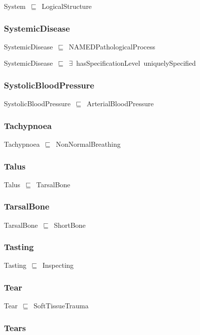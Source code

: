 \documentclass{article}
\begin{document}
System~\ensuremath{\sqsubseteq}~LogicalStructure~

\subsubsection*{SystemicDisease}

SystemicDisease~\ensuremath{\sqsubseteq}~NAMEDPathologicalProcess~

SystemicDisease~\ensuremath{\sqsubseteq}~\ensuremath{\exists}~hasSpecificationLevel~uniquelySpecified~

\subsubsection*{SystolicBloodPressure}

SystolicBloodPressure~\ensuremath{\sqsubseteq}~ArterialBloodPressure~

\subsubsection*{Tachypnoea}

Tachypnoea~\ensuremath{\sqsubseteq}~NonNormalBreathing~

\subsubsection*{Talus}

Talus~\ensuremath{\sqsubseteq}~TarsalBone~

\subsubsection*{TarsalBone}

TarsalBone~\ensuremath{\sqsubseteq}~ShortBone~

\subsubsection*{Tasting}

Tasting~\ensuremath{\sqsubseteq}~Inspecting~

\subsubsection*{Tear}

Tear~\ensuremath{\sqsubseteq}~SoftTissueTrauma~

\subsubsection*{Tears}
\end{document}
